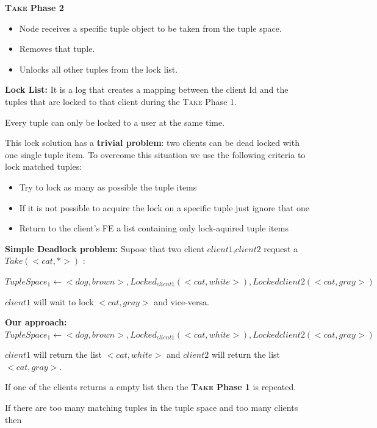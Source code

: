 \documentclass[times, 10pt,twocolumn]{article}
\begin{document}
\textbf{\textsc{Take} Phase 2}
\begin{itemize}
   \item Node receives a specific tuple object to be taken from the tuple space.
   \item Removes that tuple.
   \item Unlocks all other tuples from the lock list.
\end{itemize}

\textbf{Lock List:} It is a log that creates a mapping between the client Id and the
tuples that are locked to that client during the \textsc{Take} Phase 1.

Every tuple can only be locked to a user at the same time.

This lock solution has a \textbf{trivial problem}: two clients can be dead locked with one
single tuple item. To overcome this situation we use the following criteria to lock matched tuples:
\begin{itemize}
   \item Try to lock as many as possible the tuple items
   \item If it is not possible to acquire the lock on a specific tuple just ignore that one
   \item Return to the client's FE a list containing only lock-aquired tuple items
\end{itemize}

\textbf{Simple Deadlock problem:}
Supose that two client $client1$,$client2$ request a $ Take(<cat, *>) $ :

$ TupleSpace_{1} \leftarrow <dog, brown>, Locked_{client1}(<cat, white>), Locked{client2}(<cat, gray>) $

$client1$ will wait to lock $<cat, gray>$ and vice-versa.

\textbf{Our approach:}
$ TupleSpace_{1} \leftarrow <dog, brown>, Locked_{client1}(<cat, white>), Locked{client2}(<cat, gray>) $

$client1$ will return the list $<cat, white>$ and $client2$ will return the list $<cat, gray>$.

If one of the clients returns a empty list then the \textbf{\textsc{Take} Phase 1} is repeated.

If there are too many matching tuples in the tuple space and too many clients then
\end{document}
